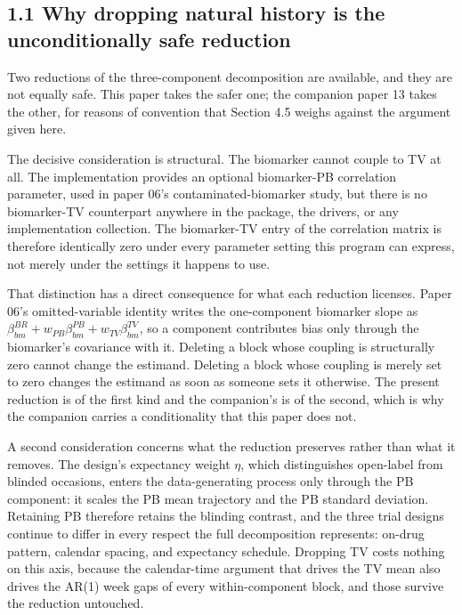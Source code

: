 \documentclass[
  11pt,
]{article}
\begin{document}
\subsection{1.1 Why dropping natural history is the unconditionally
safe reduction}

Two reductions of the three-component decomposition are available,
and they are not equally safe. This paper takes the safer one; the
companion paper 13 takes the other, for reasons of convention that
Section 4.5 weighs against the argument given here.

The decisive consideration is structural. The biomarker cannot couple
to TV at all. The implementation provides an optional biomarker-PB
correlation parameter, used in paper 06's contaminated-biomarker
study, but there is no biomarker-TV counterpart anywhere in the
package, the drivers, or any implementation collection. The
biomarker-TV entry of the correlation matrix is therefore identically
zero under every parameter setting this program can express, not
merely under the settings it happens to use.

That distinction has a direct consequence for what each reduction
licenses. Paper 06's omitted-variable identity writes the
one-component biomarker slope as \(\beta_{bm}^{BR} + w_{PB}
\beta_{bm}^{PB} + w_{TV}\beta_{bm}^{TV}\), so a component contributes
bias only through the biomarker's covariance with it. Deleting a
block whose coupling is structurally zero cannot change the estimand.
Deleting a block whose coupling is merely set to zero changes the
estimand as soon as someone sets it otherwise. The present reduction
is of the first kind and the companion's is of the second, which is
why the companion carries a conditionality that this paper does not.

A second consideration concerns what the reduction preserves rather
than what it removes. The design's expectancy weight \(\eta\), which
distinguishes open-label from blinded occasions, enters the
data-generating process only through the PB component: it scales the
PB mean trajectory and the PB standard deviation. Retaining PB
therefore retains the blinding contrast, and the three trial designs
continue to differ in every respect the full decomposition
represents: on-drug pattern, calendar spacing, and expectancy
schedule. Dropping TV costs nothing on this axis, because the
calendar-time argument that drives the TV mean also drives the AR(1)
week gaps of every within-component block, and those survive the
reduction untouched.
\end{document}
